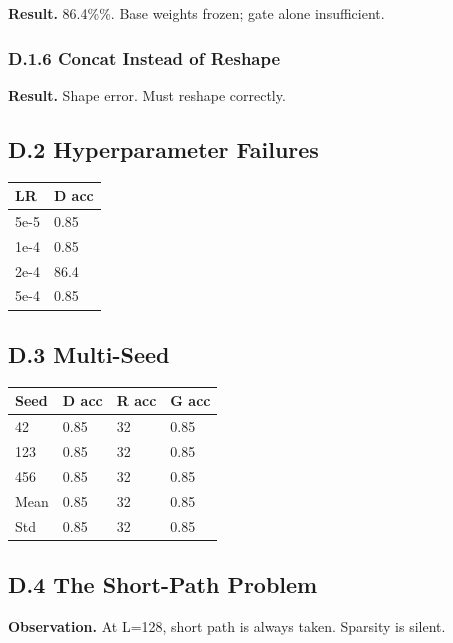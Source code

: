 \textbf{Result.} 86.4\%\%. Base weights frozen; gate alone insufficient.

\subsubsection{D.1.6 Concat Instead of Reshape}

\textbf{Result.} Shape error. Must reshape correctly.

\subsection{D.2 Hyperparameter Failures}

\begin{table}[H]
\centering
\small
\begin{tabular}{ll}
\toprule
\textbf{LR} & \textbf{D acc} \\
\midrule
5e-5 & 0.85 \\
1e-4 & 0.85 \\
2e-4 & 86.4 \\
5e-4 & 0.85 \\
\bottomrule
\end{tabular}
\end{table}

\subsection{D.3 Multi-Seed}

\begin{table}[H]
\centering
\small
\begin{tabular}{llll}
\toprule
\textbf{Seed} & \textbf{D acc} & \textbf{R acc} & \textbf{G acc} \\
\midrule
42 & 0.85 & 32 & 0.85 \\
123 & 0.85 & 32 & 0.85 \\
456 & 0.85 & 32 & 0.85 \\
Mean & 0.85 & 32 & 0.85 \\
Std & 0.85 & 32 & 0.85 \\
\bottomrule
\end{tabular}
\end{table}

\subsection{D.4 The Short-Path Problem}

\textbf{Observation.} At L=128, short path is always taken. Sparsity is silent.

